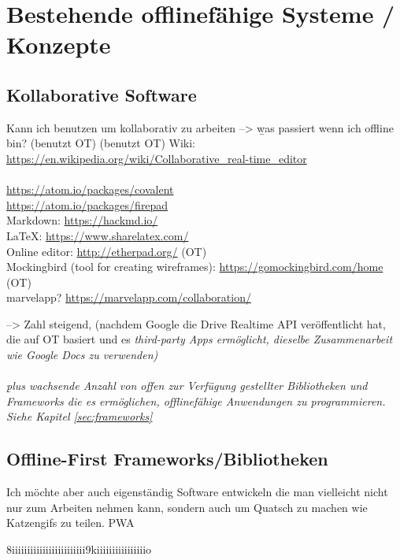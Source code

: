 \chapter{\label{chap:state}Bestehende offlinefähige Systeme / Konzepte}
%
%
\section{Kollaborative Software}
Kann ich benutzen um kollaborativ zu arbeiten --> \b{was passiert wenn ich offline bin?}
(benutzt OT)
(benutzt OT)
Wiki: \url{https://en.wikipedia.org/wiki/Collaborative_real-time_editor}\\\\
\url{https://atom.io/packages/covalent}\\
\url{https://atom.io/packages/firepad}\\
Markdown: \url{https://hackmd.io/}\\
LaTeX: \url{https://www.sharelatex.com/}\\
Online editor: \url{http://etherpad.org/} (OT)\\
Mockingbird (tool for creating wireframes): \url{https://gomockingbird.com/home} (OT)\\
marvelapp? \url{https://marvelapp.com/collaboration/}

--> Zahl steigend, (nachdem Google die Drive Realtime API veröffentlicht hat, die auf \gls{OT} basiert und es \it{third-party Apps} ermöglicht, dieselbe Zusammenarbeit wie Google Docs zu verwenden)\\\\
\b{plus} wachsende Anzahl von offen zur Verfügung gestellter Bibliotheken und Frameworks die es ermöglichen, offlinefähige Anwendungen zu programmieren. Siehe Kapitel \ref{sec:frameworks}
%
%
\section{\label{sec:frameworks}Offline-First Frameworks/Bibliotheken}
Ich möchte aber auch eigenständig Software entwickeln die man vielleicht nicht nur zum Arbeiten nehmen kann, sondern auch um Quatsch zu machen wie Katzengifs zu teilen.
\Gls{PWA}
%
%

%
%
%
%


%
%


%
%


%
%
8iiiiiiiiiiiiiiiiiiiiiiii9kiiiiiiiiiiiiiiiio
